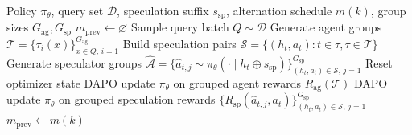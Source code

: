 \begin{algorithm}[t]
\small
\begin{algorithmic}[1]
\Require Policy $\pi_\theta$, query set $\mathcal{D}$, speculation suffix $s_{\mathrm{sp}}$, alternation schedule $m(k)$, group sizes $G_{\mathrm{ag}},G_{\mathrm{sp}}$
\State $m_{\mathrm{prev}}\gets \varnothing$
    \State Sample query batch $Q \sim \mathcal{D}$
    \State Generate agent groups $\mathcal{T}=\{\tau_i(x)\}_{x\in Q,\,i=1}^{G_{\mathrm{ag}}}$
    \State Build speculation pairs $\mathcal{S}=\{(h_t,a_t)\!: t\in\tau,\tau\in\mathcal{T}\}$
    \State Generate speculator groups $\widehat{\mathcal{A}}=\{\hat a_{t,j}\sim\pi_\theta(\cdot\mid h_t\oplus s_{\mathrm{sp}})\}_{(h_t,a_t)\in\mathcal{S},\,j=1}^{G_{\mathrm{sp}}}$
        \State Reset optimizer state
    \EndIf
        \State DAPO update $\pi_\theta$ on grouped agent rewards $R_{\mathrm{ag}}(\mathcal{T})$
    \Else
        \State DAPO update $\pi_\theta$ on grouped speculation rewards $\{R_{\mathrm{sp}}(\hat a_{t,j},a_t)\}_{(h_t,a_t)\in\mathcal{S},\,j=1}^{G_{\mathrm{sp}}}$
    \EndIf
    \State $m_{\mathrm{prev}}\gets m(k)$
\EndFor
\end{algorithmic}
\caption{Joint Agent-Speculator RL}
\label{alg:training-recipe}
\end{algorithm}
